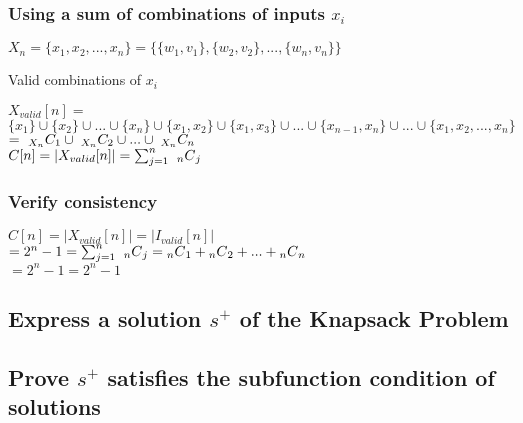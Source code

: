 \documentclass[11pt]{article}
\begin{document}
\subsubsection{Using a sum of combinations of inputs $x_i$}
\vspace{4mm}
\begin{center}
$
X_n = \{x_1,x_2,...,x_n\} = \{ \{w_1,v_1\},\{w_2,v_2\},...,\{w_n,v_n\} \}
$
\end{center}
Valid combinations of $x_i$
\begin{center}
$
X_{valid}[n] =
$
\\ \vspace{2mm}
$
\{x_1\} \cup \{x_2\} \cup ... \cup \{x_n\} \cup \{x_1,x_2\}  \cup \{x_1,x_3\} \cup ... \cup \{x_{n-1},x_{n}\} \cup ... \cup \{x_1,x_2,...,x_n\}
$
\\ \vspace{2mm}
$
= \ _{X_n}C_1 \cup \hspace{1mm} _{X_n}C_2 \cup ... \cup \hspace{1mm}_{X_n}C_n
$
\\ \vspace{6mm}
$
C[n] = |X_{valid}[n]| = {\sum _{j=1}^{n}}\hspace{2mm}{_{n}C{_j}}
$
\end{center}




\subsubsection{Verify consistency}
\begin{center}
\vspace{4mm}
$
C[n] = |X_{valid}[n]| = |I_{valid}[n]|
$
\\ \vspace{4mm}
$
= 2^n - 1 =  {\sum _{j=1}^{n}}\hspace{2mm}{_{n}C{_j}} = {_{n}C{_1}} + {_{n}C{_2}} + ... + {_{n}C{_n}}
$
\\ \vspace{4mm}
$
= 2^n -1 = 2^n -1
$
\end{center}





\subsection{Express a solution $s^+$ of the Knapsack Problem}
\subsection{Prove $s^+$ satisfies the subfunction condition of solutions}
\end{document}
